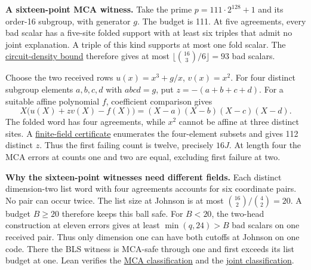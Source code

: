 \documentclass[11pt,letterpaper]{article}
\begin{document}
\textbf{A sixteen-point MCA witness.} Take the prime $p=111\cdot2^{128}+1$ and its
order-16 subgroup, with generator $g$. The budget is 111. At five agreements, every
bad scalar has a five-site folded support with at least six triples that admit no
joint explanation. A triple of this kind supports at most one fold scalar. The
\href{https://github.com/SlopDotCash/proximityprize/blob/520ef4d923f79a2115c32b0d3f6a56ab425226cf/ArkLib/Research/ProximityGap/SixteenMcaJohnson.lean}{circuit-density bound}
therefore gives at most $\lfloor\binom{16}{3}/6\rfloor=93$ bad scalars.

Choose the two received rows $u(x)=x^3+g/x$, $v(x)=x^2$. For four distinct subgroup
elements $a,b,c,d$ with $abcd=g$, put $z=-(a+b+c+d)$. For a suitable affine
polynomial $f$, coefficient comparison gives
\[
                 X\bigl(u(X)+zv(X)-f(X)\bigr)
                    =(X-a)(X-b)(X-c)(X-d).
\]
The folded word has four agreements, while $x^2$ cannot be affine at three distinct
sites. A \href{https://github.com/SlopDotCash/proximityprize/blob/520ef4d923f79a2115c32b0d3f6a56ab425226cf/ArkLib/Research/ProximityGap/Frontier/JohnsonQuarticMca.lean}{finite-field certificate}
enumerates the four-element subsets and gives 112 distinct $z$. Thus the first
failing count is twelve, precisely $16J$. At length four the MCA errors at counts
one and two are equal, excluding first failure at two.

\textbf{Why the sixteen-point witnesses need different fields.} Each distinct
dimension-two list word with four agreements accounts for six coordinate pairs.
No pair can occur twice. The list size at Johnson is at most
$\binom{16}{2}/\binom{4}{2}=20$. A budget $B\ge20$ therefore keeps this ball safe.
For $B<20$, the two-head construction at eleven errors gives at least
$\min(q,24)>B$ bad scalars on one received pair. Thus only dimension one can have
both cutoffs at Johnson on one code. There the BLS witness is MCA-safe through one
and first exceeds its list budget at one. Lean verifies the
\href{https://github.com/SlopDotCash/proximityprize/blob/520ef4d923f79a2115c32b0d3f6a56ab425226cf/ArkLib/Research/ProximityGap/JohnsonMcaRealization.lean}{MCA classification}
and the \href{https://github.com/SlopDotCash/proximityprize/blob/520ef4d923f79a2115c32b0d3f6a56ab425226cf/ArkLib/Research/ProximityGap/JointJohnsonEquality.lean}{joint classification}.

\newpage
\end{document}
